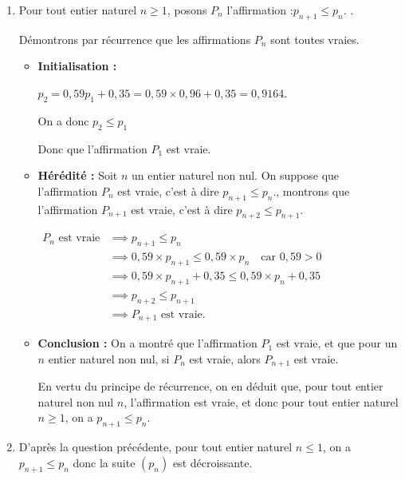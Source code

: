 \documentclass[10pt]{article}
\begin{document}
\begin{enumerate}
	\item Pour tout entier naturel  $n \geqslant 1$, posons $P_n$ l'affirmation :\quad \og $p_{n+1} \leqslant p_{n}$. \fg{}.
	
	Démontrons par récurrence que les affirmations $P_n$ sont toutes vraies.
	
	\begin{itemize}[label={\textbullet~}]
		\item \textbf{Initialisation :} 
		
		$p_2= 0,59 p_{1}+0,35 = 0,59 \times 0,96 + 0,35 = 0,9164$. 
		
		On a donc $p_2 \leqslant p_1$
		
		Donc que l'affirmation $P_1$ est vraie.
		
		\item \textbf{Hérédité :} Soit $n$ un entier naturel non nul. On suppose que l'affirmation $P_n$ est vraie, c'est à dire $p_{n+1} \leqslant p_n  $\fg{}., montrons que l'affirmation $P_{n+1}$ est vraie, c'est à dire $p_{n+2} \leqslant p_{n+1}$\fg{}.
		
		$\begin{aligned}
			P_n \text{ est vraie}
			&\implies p_{n+1} \leqslant p_n \\
			&\implies  0,59 \times p_{n+1} \leqslant 0,59 \times  p_n \quad \text{car } 0,59>0 \\
			&\implies  0,59 \times p_{n+1} + 0,35  \leqslant 0,59 \times  p_n + 0,35  \\
			&\implies p_{n+2} \leqslant p_{n+1}  \\
			&\implies P_{n+1}\text{ est vraie.}
		\end{aligned}$
		
		\item \textbf{Conclusion :} On a montré que l'affirmation $P_1$ est vraie, et que pour un $n$ entier naturel non nul, si $P_n$ est vraie, alors $P_{n+1}$ est vraie.
		
		En vertu du principe de récurrence, on en déduit que, pour tout entier naturel non nul $n$, l'affirmation est vraie, et donc pour tout entier naturel $n \geqslant 1 $, on a $p_{n+1} \leqslant p_{n}$.
		
	\end{itemize}
	
	
	
	
	\item D'après la question précédente, pour tout entier naturel $n \leqslant 1 $, on a $p_{n+1} \leqslant p_{n}$ donc la suite $(p_{n})$ est décroissante. 
	

\end{enumerate}
\end{document}
